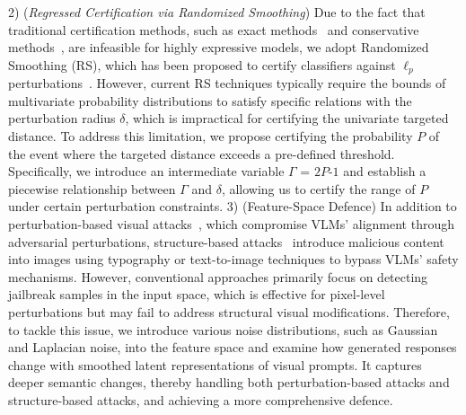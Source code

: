 2) (\textit{Regressed Certification via Randomized Smoothing}) Due to the fact that traditional certification methods, such as exact methods~\citep{katz2017reluplexefficientsmtsolver, cheng2017maximumresilienceartificialneural, huang2017safetyverificationdeepneural} and conservative methods~\citep{gouk2020regularisationneuralnetworksenforcing, hein2017formalguaranteesrobustnessclassifier, wong2018provabledefensesadversarialexamples}, are infeasible for highly expressive models, we adopt Randomized Smoothing (RS), which has been proposed to certify classifiers against $\ell_p$ perturbations~\citep{cohen2019certifiedadversarialrobustnessrandomized, lecuyer2019certifiedrobustnessadversarialexamples, li2019certified}. However, current RS techniques typically require the bounds of multivariate probability distributions to satisfy specific relations with the perturbation radius $\delta$, which is impractical for certifying the univariate targeted distance. To address this limitation, we propose certifying the probability $P$ of the event where the targeted distance exceeds a pre-defined threshold. Specifically, we introduce an intermediate variable $\Gamma$ = $2P$-$1$ and establish a piecewise relationship between $\Gamma$ and $\delta$, allowing us to certify the range of $P$ under certain perturbation constraints. %
3) (Feature-Space Defence) In addition to perturbation-based visual attacks~\citep{luo2023image,shayegani2023jailbreak,zhao2024evaluating}, which compromise VLMs' alignment through adversarial perturbations, structure-based attacks~\citep{gong2023figstepjailbreakinglargevisionlanguage,liu2024mmsafetybenchbenchmarksafetyevaluation} introduce malicious content into images using typography or text-to-image techniques to bypass VLMs' safety mechanisms. However, conventional approaches primarily focus on detecting jailbreak samples in the input space, which is effective for pixel-level perturbations but may fail to address structural visual modifications. Therefore, 
to tackle this issue, 
we introduce various noise distributions, such as Gaussian and Laplacian noise, into the feature space and examine how generated responses change with smoothed latent representations of visual prompts. It captures deeper semantic changes, thereby handling both perturbation-based attacks and structure-based attacks, and achieving a more comprehensive defence.  

